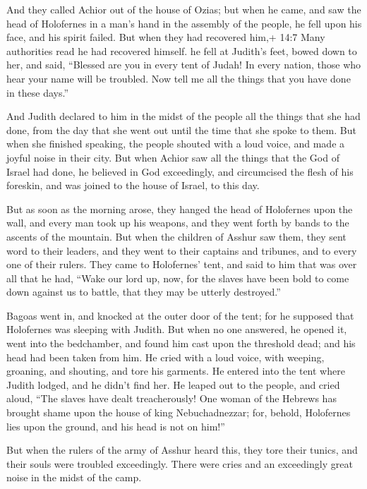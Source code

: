  And they called Achior out of the house of Ozias; but when
he came, and saw the head of Holofernes in a man's hand in the assembly
of the people, he fell upon his face, and his spirit failed.
 But when they had recovered him,+ 14:7 Many authorities
read he had recovered himself. he fell at Judith's feet, bowed down to
her, and said, ``Blessed are you in every tent of Judah! In every
nation, those who hear your name will be troubled.  Now tell
me all the things that you have done in these days.''

And Judith declared to him in the midst of the people all the things
that she had done, from the day that she went out until the time that
she spoke to them.  But when she finished speaking, the
people shouted with a loud voice, and made a joyful noise in their city.
 But when Achior saw all the things that the God of Israel
had done, he believed in God exceedingly, and circumcised the flesh of
his foreskin, and was joined to the house of Israel, to this day.

 But as soon as the morning arose, they hanged the head of
Holofernes upon the wall, and every man took up his weapons, and they
went forth by bands to the ascents of the mountain.  But
when the children of Asshur saw them, they sent word to their leaders,
and they went to their captains and tribunes, and to every one of their
rulers.  They came to Holofernes' tent, and said to him
that was over all that he had, ``Wake our lord up, now, for the slaves
have been bold to come down against us to battle, that they may be
utterly destroyed.''

 Bagoas went in, and knocked at the outer door of the tent;
for he supposed that Holofernes was sleeping with Judith. 
But when no one answered, he opened it, went into the bedchamber, and
found him cast upon the threshold dead; and his head had been taken from
him.  He cried with a loud voice, with weeping, groaning,
and shouting, and tore his garments.  He entered into the
tent where Judith lodged, and he didn't find her. He leaped out to the
people, and cried aloud,  ``The slaves have dealt
treacherously! One woman of the Hebrews has brought shame upon the house
of king Nebuchadnezzar; for, behold, Holofernes lies upon the ground,
and his head is not on him!''

 But when the rulers of the army of Asshur heard this, they
tore their tunics, and their souls were troubled exceedingly. There were
cries and an exceedingly great noise in the midst of the camp.

